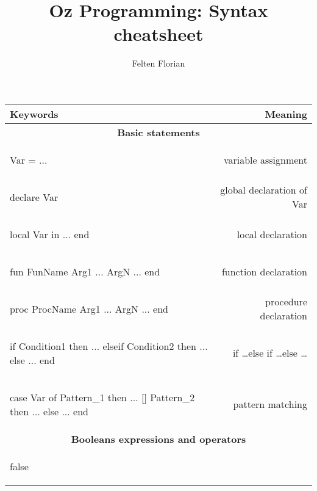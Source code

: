 \documentclass[12pt]{article}
\title{Oz Programming: Syntax cheatsheet}
\author{Felten Florian}
\begin{document}
\maketitle

\begin{longtable}{l r}
\toprule[0.2em]
\multicolumn{1}{l}{\textbf{Keywords}} & \textbf{Meaning}\\
\midrule


\multicolumn{2}{c}{\textbf{Basic statements}}\\

\begin{oz}
Var = ...
\end{oz}
&variable assignment\\

\begin{oz}
declare Var 
\end{oz}
&global declaration of Var\\
 
\begin{oz}
local Var in 
	...
end
\end{oz}
&local declaration\\
 
 
\begin{oz}
fun {FunName Arg1 ... ArgN}
	...
end
\end{oz}
&function declaration\\
 
\begin{oz}
proc {ProcName Arg1 ... ArgN}
	...
end
\end{oz}
&procedure declaration\\

\begin{oz}
if Condition1 then
	...
elseif Condition2 then 
	...
else
	...
end
\end{oz}
&if \dots else if \dots else \dots \\
 
 
\begin{oz}
case Var of Pattern_1 then ...
[] Pattern_2 then ...
else ...
end
\end{oz}
&pattern matching \\[0.4em]



\multicolumn{2}{c}{\textbf{Booleans expressions and operators}}\\
\begin{oz}
false 
\end{oz}
&\\
 

\end{longtable}
\end{document}
